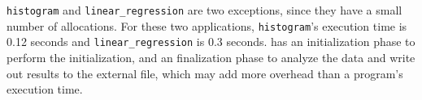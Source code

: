 \texttt{histogram} and \texttt{linear\_regression} are two exceptions, since they have a small number of allocations. For these two applications, \texttt{histogram}'s execution time is 0.12 seconds and \texttt{linear\_regression} is 0.3 seconds. \MP{} has an initialization phase to perform the initialization, and an finalization phase to analyze the data and write out results to the external file, which may add more overhead than a program's execution time. 



